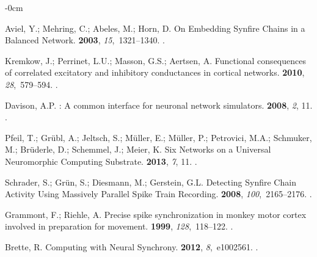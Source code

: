 \documentclass[brainsci, %
               review,accept,pdftex,moreauthors
               ]{Definitions/mdpi}
\begin{document}
\begin{adjustwidth}{-\extralength}{0cm}
\begin{thebibliography}{999}
Aviel, Y.; Mehring, C.; Abeles, M.; Horn, D.
\newblock On {Embedding} {Synfire} {Chains} in a {Balanced} {Network}.
 {\bf 2003}, {\em 15},~1321--1340.
.

Kremkow, J.; Perrinet, L.U.; Masson, G.S.; Aertsen, A.
\newblock Functional consequences of correlated excitatory and inhibitory
  conductances in cortical networks.
 {\bf 2010}, {\em
  28},~579--594.
.

Davison, A.P.
: A common interface for neuronal network simulators.
 {\bf 2008}, {\em 2}, 11.
.

Pfeil, T.; Grübl, A.; Jeltsch, S.; Müller, E.; Müller, P.; Petrovici, M.A.;
  Schmuker, M.; Brüderle, D.; Schemmel, J.; Meier, K.
\newblock Six {Networks} on a {Universal} {Neuromorphic} {Computing}
  {Substrate}.
 {\bf 2013}, {\em 7}, 11.
.

Schrader, S.; Grün, S.; Diesmann, M.; Gerstein, G.L.
\newblock Detecting {Synfire} {Chain} {Activity} {Using} {Massively} {Parallel}
  {Spike} {Train} {Recording}.
 {\bf 2008}, {\em 100},~2165--2176.
.

Grammont, F.; Riehle, A.
\newblock Precise spike synchronization in monkey motor cortex involved in
  preparation for movement.
 {\bf 1999}, {\em 128},~118--122.
.

Brette, R.
\newblock Computing with {Neural} {Synchrony}.
 {\bf 2012}, {\em 8},~e1002561.
.


\end{thebibliography}
\end{adjustwidth}
\end{document}
